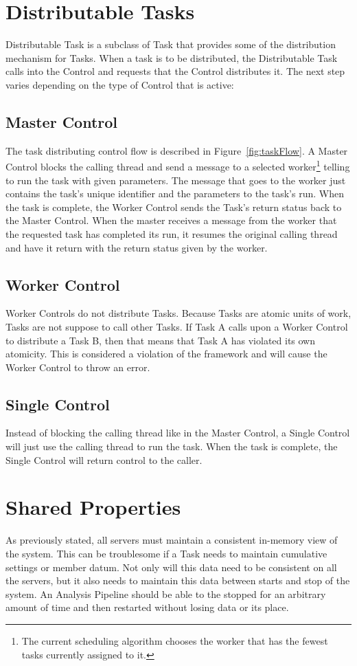 \documentclass[12pt]{ucthesis}
\begin{document}
\section{Distributable Tasks}
\label{arch-dist-tasks}
Distributable Task is a subclass of Task that provides some of the distribution mechanism for Tasks.
When a task is to be distributed, the Distributable Task calls into the Control and requests that
the Control distributes it. The next step varies depending on the type of Control that is active:

\subsection{Master Control}
The task distributing control flow is described in Figure~\ref{fig:taskFlow}.
A Master Control blocks the calling thread and send a message to a selected worker\footnote{The
current scheduling algorithm chooses the worker that has the fewest tasks currently assigned to it.} telling to
run the task with given parameters. The message that goes to the worker just contains the task's unique identifier
and the parameters to the task's run. When the task is complete, the Worker Control sends the Task's return
status back to the Master Control. When the master receives a message from the worker that the requested task
has completed its run, it resumes the original calling thread and have it return with the return status given
by the worker.

\subsection{Worker Control}
Worker Controls do not distribute Tasks.
Because Tasks are atomic units of work, Tasks are not suppose to call other Tasks.
If Task A calls upon a Worker Control to distribute a Task B, then that means that Task A has violated
its own atomicity. This is considered a violation of the framework and will cause the Worker Control to throw an error.

\subsection{Single Control}
Instead of blocking the calling thread like in the Master Control, a Single Control
will just use the calling thread to run the task. When the task is complete,
the Single Control will return control to the caller.

\section{Shared Properties}
\label{arch-props}
As previously stated, all servers must maintain a consistent in-memory view of the system.
This can be troublesome if a Task needs to maintain cumulative settings or member datum.
Not only will this data need to be consistent on all the servers, but it also needs to maintain this
data between starts and stop of the system. An Analysis Pipeline should be able to the stopped for an arbitrary amount
of time and then restarted without losing data or its place.
\end{document}
